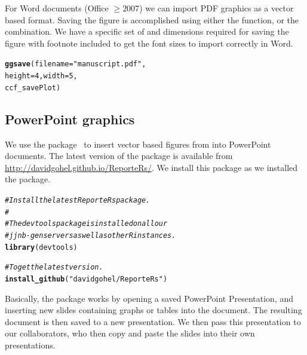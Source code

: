 \documentclass[nojss, letterpaper]{jss}\usepackage[]{graphicx}\usepackage[]{color}
\makeatletter
\newcommand{\hlnum}[1]{\textcolor[rgb]{0.686,0.059,0.569}{#1}}%
\newcommand{\hlstr}[1]{\textcolor[rgb]{0.192,0.494,0.8}{#1}}%
\newcommand{\hlcom}[1]{\textcolor[rgb]{0.678,0.584,0.686}{\textit{#1}}}%
\newcommand{\hlstd}[1]{\textcolor[rgb]{0.345,0.345,0.345}{#1}}%
\newcommand{\hlkwc}[1]{\textcolor[rgb]{0.333,0.667,0.333}{#1}}%
\newcommand{\hlkwd}[1]{\textcolor[rgb]{0.737,0.353,0.396}{\textbf{#1}}}%
\newenvironment{kframe}{%
 \def\at@end@of@kframe{}%
 \ifinner\ifhmode%
  \def\at@end@of@kframe{\end{minipage}}%
  \begin{minipage}{\columnwidth}%
 \fi\fi%
 \def\FrameCommand##1{\hskip\@totalleftmargin \hskip-\fboxsep
 \colorbox{shadecolor}{##1}\hskip-\fboxsep
     \hskip-\linewidth \hskip-\@totalleftmargin \hskip\columnwidth}%
 \MakeFramed {\advance\hsize-\width
   \@totalleftmargin\z@ \linewidth\hsize
   \@setminipage}}%
 {\par\unskip\endMakeFramed%
 \at@end@of@kframe}
\newenvironment{knitrout}{}{} %
\makeatother
\begin{document}
For Word documents (Office $\ge 2007$) we can import PDF graphics as a vector based format. Saving the figure is accomplished using either the  function, or the  combination. We have a specific set of  and  dimensions required for saving the figure with footnote included to get the font sizes to import correctly in Word. 
\begin{knitrout}\footnotesize
{}\color{fgcolor}\begin{kframe}
\begin{alltt}
\hlkwd{ggsave}\hlstd{(}\hlkwc{filename}\hlstd{=}\hlstr{"manuscript.pdf"}\hlstd{,}
       \hlkwc{height}\hlstd{=}\hlnum{4}\hlstd{,} \hlkwc{width}\hlstd{=}\hlnum{5}\hlstd{,}
       \hlstd{ccf_savePlot)}
\end{alltt}
\end{kframe}
\end{knitrout}


\subsection{PowerPoint graphics}
We use the  package~\citep{Gohel:2014} to insert vector based figures from  into PowerPoint documents. The latest version of the  package is available from \url{http://davidgohel.github.io/ReporteRs/}. We install this package as we installed the  package.
\begin{knitrout}\footnotesize
{}\color{fgcolor}\begin{kframe}
\begin{alltt}
\hlcom{# Install the latest ReporteRs package.}
\hlcom{#}
\hlcom{# The devtools package is installed on all our }
\hlcom{# jjnb-gen servers as well as other R instances.}
\hlkwd{library}\hlstd{(devtools)}

\hlcom{# To get the latest version.}
\hlkwd{install_github}\hlstd{(}\hlstr{"davidgohel/ReporteRs"}\hlstd{)}
\end{alltt}
\end{kframe}
\end{knitrout}

Basically, the package works by opening a saved PowerPoint Presentation, and inserting new slides containing graphs or tables into the document. The resulting document is then saved to a new presentation. We then pass this presentation to our collaborators, who then copy and paste the  slides into their own presentations. 
\end{document}
